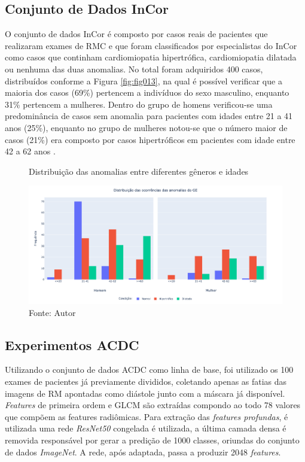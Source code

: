 \subsection{Conjunto de Dados InCor} 
\label{subsec:cap5_incor}

O conjunto de dados \gls{InCor} é composto por casos reais de pacientes que realizaram exames de RMC e que foram classificados por especialistas do \gls{InCor} como casos que continham cardiomiopatia hipertrófica, cardiomiopatia dilatada ou nenhuma das duas anomalias. No total foram adquiridos 400 casos, distribuídos conforme a Figura \ref{fig:fig013}, na qual é possível verificar que a maioria dos casos (69\%) pertencem a indivíduos do sexo masculino, enquanto 31\% pertencem a mulheres. Dentro do grupo de homens verificou-se uma predominância de casos sem anomalia para pacientes com idades entre 21 a 41 anos (25\%), enquanto no grupo de mulheres notou-se que o número maior de casos (21\%) era composto por casos hipertróficos em pacientes com idade entre 42 a 62 anos \cite{bergamascoRECUPERACAOOBJETOSMEDICOS2018}.

\begin{figure}[htbp]
    \centering
    \caption{Distribuição das anomalias entre diferentes gêneros e idades}
    \includegraphics[width=1\textwidth]{figures/fig012.png}
    \caption*{Fonte: Autor}
    \label{fig:fig012}
\end{figure}

\subsection{Experimentos ACDC}
\label{subsec:cap5_experimentos_acdc}

Utilizando o conjunto de dados \gls{ACDC} como linha de base, foi utilizado os 100 exames de pacientes já previamente divididos, coletando apenas as fatias das imagens de RM apontadas como diástole junto com a máscara já disponível. \textit{Features} de primeira ordem e \gls{GLCM} são extraídas compondo ao todo 78 valores que compõem as features radiômicas. Para extração das \textit{features profundas}, é utilizada uma rede \textit{ResNet50} congelada é utilizada, a última camada densa é removida responsável por gerar a predição de 1000 classes, oriundas do conjunto de dados \textit{ImageNet}. A rede, após adaptada, passa a produzir 2048 \textit{features}.

